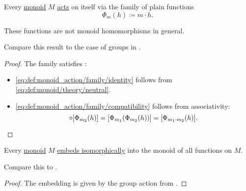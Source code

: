 \begin{proposition}\label{thm:monoid_is_action}
  Every \hyperref[def:monoid]{monoid} \( M \) \hyperref[def:monoid_action]{acts} on itself via the family of plain functions
  \begin{equation*}
    \Phi_m(h) \coloneqq m \cdot h.
  \end{equation*}
\end{proposition}
\begin{comments}
  \item These functions are not monoid homomorphisms in general.
  \item Compare this result to the case of groups in .
\end{comments}
\begin{proof}
  The family satisfies :
  \begin{itemize}
    \item \ref{eq:def:monoid_action/family/identity} follows from \eqref{eq:def:monoid/theory/neutral}.

    \item \ref{eq:def:monoid_action/family/compatibility} follows from associativity:
    \begin{equation*}
      [\Phi_{m_1}(h)] \bincirc [\Phi_{m_2}(h)] = [\Phi_{m_1}(\Phi_{m_2}(h))] = [\Phi_{m_1 \cdot m_2}(h)].
    \end{equation*}
  \end{itemize}
\end{proof}

\begin{theorem}\label{thm:cayleys_theorem_for_monoids}
  Every \hyperref[def:monoid]{monoid} \( M \) \hyperref[rem:embeds_isomorphically]{embeds isomorphically} into the monoid of all functions on \( M \).
\end{theorem}
\begin{comments}
  \item Compare this to .
\end{comments}
\begin{proof}
  The embedding is given by the group action from .
\end{proof}

